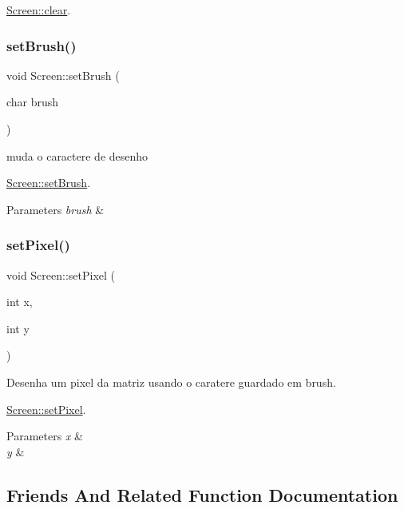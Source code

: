\hyperlink{classScreen_a35e74266b2a04e37b354ceff7a5f1031}{Screen\+::clear}. \mbox{\label{classScreen_a14a00e158f99df199772172554a20576}} 
\subsubsection{\texorpdfstring{set\+Brush()}{setBrush()}}
{\footnotesize\ttfamily void Screen\+::set\+Brush (\begin{DoxyParamCaption}\item[{char}]{brush }\end{DoxyParamCaption})}



muda o caractere de desenho 

\hyperlink{classScreen_a14a00e158f99df199772172554a20576}{Screen\+::set\+Brush}.


\begin{DoxyParams}{Parameters}
{\em brush} & \\
\hline
\end{DoxyParams}
\mbox{\label{classScreen_ae6bea81c57a22d226507c3c26fa95ee0}} 
\subsubsection{\texorpdfstring{set\+Pixel()}{setPixel()}}
{\footnotesize\ttfamily void Screen\+::set\+Pixel (\begin{DoxyParamCaption}\item[{int}]{x,  }\item[{int}]{y }\end{DoxyParamCaption})}



Desenha um pixel da matriz usando o caratere guardado em \textquotesingle{}brush\textquotesingle{}. 

\hyperlink{classScreen_ae6bea81c57a22d226507c3c26fa95ee0}{Screen\+::set\+Pixel}.


\begin{DoxyParams}{Parameters}
{\em x} & \\
\hline
{\em y} & \\
\hline
\end{DoxyParams}


\subsection{Friends And Related Function Documentation}
\mbox{\label{classScreen_aab6a2880746bfe1b7964817cc8f0989e}} 
